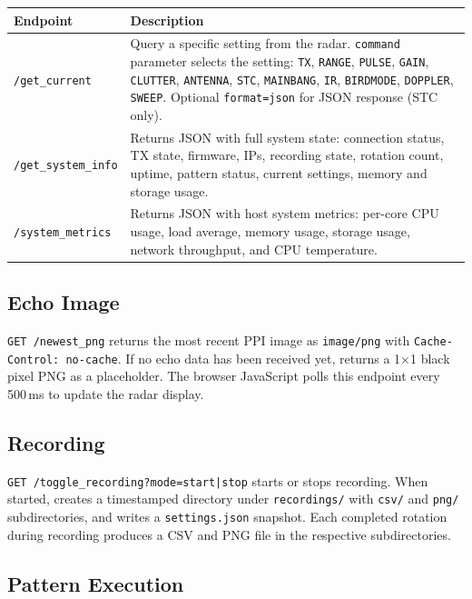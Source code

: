 \documentclass[11pt,letterpaper]{article}
\begin{document}
\begin{longtable}{l p{9cm}}
\toprule
\textbf{Endpoint} & \textbf{Description} \\
\midrule
\texttt{/get\_current} & Query a specific setting from the radar. \texttt{command} parameter selects the setting: \texttt{TX}, \texttt{RANGE}, \texttt{PULSE}, \texttt{GAIN}, \texttt{CLUTTER}, \texttt{ANTENNA}, \texttt{STC}, \texttt{MAINBANG}, \texttt{IR}, \texttt{BIRDMODE}, \texttt{DOPPLER}, \texttt{SWEEP}. Optional \texttt{format=json} for JSON response (STC only). \\
\texttt{/get\_system\_info} & Returns JSON with full system state: connection status, TX state, firmware, IPs, recording state, rotation count, uptime, pattern status, current settings, memory and storage usage. \\
\texttt{/system\_metrics} & Returns JSON with host system metrics: per-core CPU usage, load average, memory usage, storage usage, network throughput, and CPU temperature. \\
\bottomrule
\end{longtable}

\subsection{Echo Image}
\label{subsec:api-echo-image}

\texttt{GET /newest\_png} returns the most recent PPI image as \texttt{image/png} with \texttt{Cache-Control: no-cache}. If no echo data has been received yet, returns a 1$\times$1 black pixel PNG as a placeholder. The browser JavaScript polls this endpoint every 500\,ms to update the radar display.

\subsection{Recording}
\label{subsec:api-recording}

\texttt{GET /toggle\_recording?mode=start|stop} starts or stops recording. When started, creates a timestamped directory under \texttt{recordings/} with \texttt{csv/} and \texttt{png/} subdirectories, and writes a \texttt{settings.json} snapshot. Each completed rotation during recording produces a CSV and PNG file in the respective subdirectories.

\subsection{Pattern Execution}
\label{subsec:api-patterns}
\end{document}
